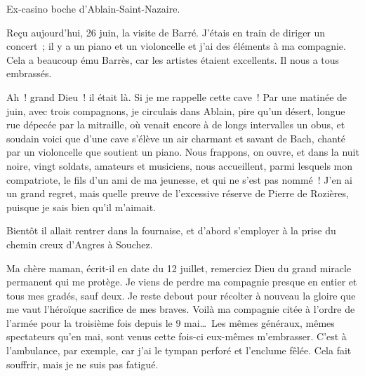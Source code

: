 \documentclass[french,twoside]{book} %
\newenvironment{quoteblock}%
  {\begin{quoting}}
  {\end{quoting}}
\newenvironment{quotebar}{%
    \def\FrameCommand{{\color{rubric!10!}\vrule width 0.5em} \hspace{0.9em}}%
    \def\OuterFrameSep{\itemsep} %
    \MakeFramed {\advance\hsize-\width \FrameRestore}
  }%
  {%
    \endMakeFramed
  }
\renewenvironment{quoteblock}%
  {%
    \savenotes
    \setstretch{0.9}
    \normalfont
    \begin{quotebar}
  }
  {%
    \end{quotebar}
    \spewnotes
  }
\begin{document}
\begin{quoteblock}
 \noindent Ex-casino boche d’Ablain-Saint-Nazaire.‌\par
 Reçu aujourd’hui, 26 juin, la visite de Barré. J’étais en train de diriger un concert ; il y a un piano et un violoncelle et j’ai des éléments à ma compagnie. Cela a beaucoup ému Barrès, car les artistes étaient excellents. Il nous a tous embrassés.‌
 \end{quoteblock}

\noindent Ah ! grand Dieu ! il était là. Si je me rappelle cette cave ! Par une matinée de juin, avec trois compagnons, je circulais dans Ablain, pire qu’un désert, longue rue dépecée par la mitraille, où venait encore à de longs intervalles un obus, et soudain voici que d’une cave s’élève un air charmant et savant de Bach, chanté par un violoncelle que soutient un piano. Nous frappons, on ouvre, et dans la nuit noire, vingt soldats, amateurs et musiciens, nous accueillent, parmi lesquels mon compatriote, le fils d’un ami de ma jeunesse, et qui ne s’est pas nommé ! J’en ai un grand regret, mais quelle preuve de l’excessive réserve de Pierre de Rozières, puisque je sais bien qu’il m’aimait.‌\par
Bientôt il allait rentrer dans la fournaise, et d’abord s’employer à la prise du chemin creux d’Angres à Souchez.‌\par

\begin{quoteblock}
 \noindent Ma chère maman, écrit-il en date du 12 juillet, remerciez Dieu du grand miracle permanent qui me protège. Je viens de perdre ma compagnie presque en entier et tous mes gradés, sauf deux. Je reste debout pour récolter à nouveau la gloire que me vaut l’héroïque sacrifice de mes braves. Voilà ma compagnie citée à l’ordre de l’armée pour la troisième fois depuis le 9 mai… Les mêmes généraux, mêmes spectateurs qu’en mai, sont venus cette fois-ci eux-mêmes m’embrasser. C’est à l’ambulance, par exemple, car j’ai le tympan perforé et l’enclume fêlée. Cela fait souffrir, mais je ne suis pas fatigué.‌
 \end{quoteblock}
\end{document}
